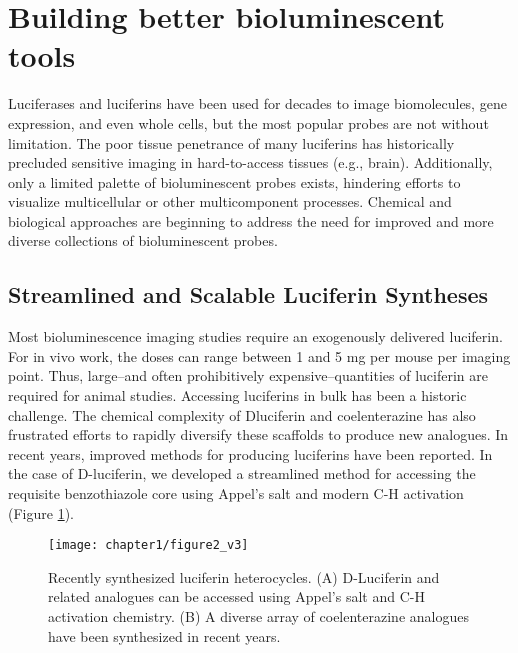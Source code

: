 \section{Building better bioluminescent tools}
Luciferases and luciferins have been used for decades to image
biomolecules, gene expression, and even whole cells, but the
most popular probes are not without limitation.\cite{RN26} The poor
tissue penetrance of many luciferins has historically precluded
sensitive imaging in hard-to-access tissues (e.g., brain).
Additionally, only a limited palette of bioluminescent probes
exists, hindering efforts to visualize multicellular or other
multicomponent processes. Chemical and biological approaches
are beginning to address the need for improved and
more diverse collections of bioluminescent probes.
\subsection*{Streamlined and Scalable Luciferin Syntheses} 
Most bioluminescence imaging studies require an exogenously
delivered luciferin. For in vivo work, the doses can range
between 1 and 5 mg per mouse per imaging point. Thus,
large--and often prohibitively expensive--quantities of luciferin
are required for animal studies. Accessing luciferins in bulk
has been a historic challenge. The chemical complexity of Dluciferin
and coelenterazine has also frustrated efforts to rapidly
diversify these scaffolds to produce new analogues.
In recent years, improved methods for producing luciferins
have been reported. In the case of D-luciferin, we developed a
streamlined method for accessing the requisite benzothiazole
core using Appel's salt and modern C-H activation (Figure \ref{fig:luc_derivatives}).\cite{McCutcheon:2012ixb} 

\begin{figure}[htbp]
\texttt{[image: chapter1/figure2\_v3]}
\centering
\caption[Recently synthesized luciferin heterocycles]{Recently synthesized luciferin heterocycles. (A) D-Luciferin
and related analogues can be accessed using Appel's salt and C-H
activation chemistry. (B) A diverse array of coelenterazine analogues
have been synthesized in recent years.}
  \label{fig:luc_derivatives}
\end{figure}

